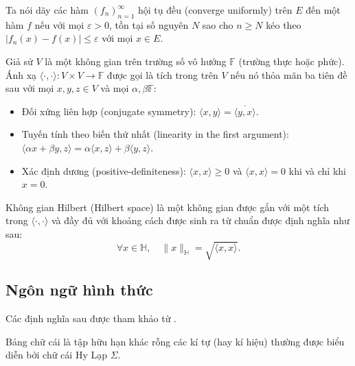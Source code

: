 \begin{defn}
  Ta nói dãy các hàm $(f_n)_{n = 1}^\infty$ hội tụ đều (converge uniformly)
  trên $E$ đến một hàm $f$ nếu với mọi $\varepsilon > 0$, tồn tại số nguyên $N$
  sao cho $n \ge N$ kéo theo $\bigl \lvert f_n(x) - f(x) \bigr \rvert \le
  \varepsilon$ với mọi $x \in E$.
\end{defn}

\begin{defn}
  Giả sử $V$ là một không gian  trên trường số vô hướng $\mathbb{F}$
  (trường thực hoặc phức). Ánh xạ $\langle \cdot, \cdot \rangle \colon V \times
  V \to \mathbb{F}$ được gọi là tích trong trên $V$ nếu nó thỏa mãn ba tiên đề
  sau với mọi $x, y , z \in V$ và mọi $\alpha, \beta \mathbb{F}$:
  \begin{itemize}
    \item Đối xứng liên hợp (conjugate symmetry): $\langle x, y \rangle
      = \overline{\langle y, x \rangle}$.
    \item Tuyến tính theo biến thứ nhất (linearity in the first argument):
      $\langle \alpha x + \beta y, z \rangle = \alpha\langle x, z \rangle +
      \beta \langle y, z \rangle$.
    \item Xác định dương (positive-definiteness): $\langle x, x \rangle \ge 0$
      và $\langle x, x \rangle  = 0$ khi và chỉ khi $x = 0$.
  \end{itemize}
\end{defn}

\begin{defn}
  Không gian Hilbert (Hilbert space) là một không gian  được gắn với
  một tích trong $\langle \cdot, \cdot \rangle$ và đầy đủ với khoảng cách được
  sinh ra từ chuẩn được định nghĩa như sau: \begin{equation}
    \forall x \in \mathbb{H}, \quad \lVert x \rVert_\mathbb{H} = \sqrt{\langle
    x, x \rangle }.
  \end{equation}
\end{defn}

\subsection{Ngôn ngữ hình thức}

Các định nghĩa sau được tham khảo từ \cite[chương~1]{Phuong2018}.

\begin{defn}
  Bảng chữ cái là tập hữu hạn khác rỗng các kí tự (hay kí hiệu) thường được
  biểu diễn bởi chữ cái Hy Lạp $\Sigma$.
\end{defn}

